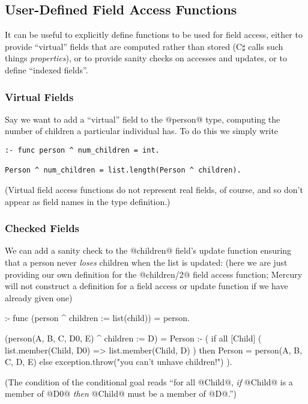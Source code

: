 \subsection{User-Defined Field Access Functions}

It can be useful to explicitly define functions to be used for field access,
either to provide ``virtual'' fields that are computed rather than stored
(C$\sharp$ calls such things \emph{properties}), or to provide sanity checks
on accesses and updates, or to define ``indexed fields''.

\subsubsection{Virtual Fields}

Say we want to add a ``virtual'' field to the @person@ type, computing the
number of children a particular individual has.
To do this we simply write
\begin{verbatim}
:- func person ^ num_children = int.

Person ^ num_children = list.length(Person ^ children).
\end{verbatim}
(Virtual field access functions do not represent real fields, of course, and
so don't appear as field names in the type definition.)

\subsubsection{Checked Fields}

We can add a sanity check to the @children@ field's update function
ensuring that a person never \emph{loses} children when the list is updated:
(here we are just providing our own definition for the @children/2@ field
access function; Mercury will not construct a definition for a field access
or update function if we have already given one)
\begin{myverbatim}
:- func (person ^ children := list(child)) = person.

(person(A, B, C, D0, E) ^ children := D) = Person :-
    ( if all [Child] (
            list.member(Child, D0) => list.member(Child, D)
      ) 
      then Person = person(A, B, C, D, E)
      else exception.throw("you can't unhave children!")
    ).
\end{myverbatim}
(The condition of the conditional goal reads ``for all @Child@, \emph{if}
@Child@ is a member of @D0@ \emph{then} @Child@ must be a member of @D@.'')

